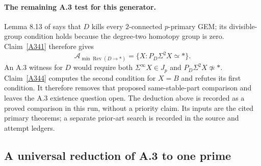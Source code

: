 \paragraph{The remaining A.3 test for this generator.}
Lemma 8.13 of \citet{ABousfield1997} says that $D$ kills every
$2$-connected $p$-primary GEM; its divisible-group condition
holds because the degree-two homotopy group is zero.
Claim~\ref{A341} therefore gives
\[
 \mathcal A_{\min\operatorname{Rev}(D\to*)}
   =\{X:P_D\Sigma^2X\simeq *\}.
 \tag{A34.4.6}
\]
An A.3 witness for $D$ would require both
$\Sigma^\infty X\in J_p$ and $P_D\Sigma^2X\not\simeq *$.
Claim~\ref{A344} computes the second condition for $X=B$ and
refutes its first condition.  It therefore removes that proposed
same-stable-part comparison and leaves the A.3 existence question open.
The deduction above is recorded as a proved comparison in this run,
without a priority claim.  Its inputs are the cited primary theorems;
a separate prior-art search is recorded in the source and attempt ledgers.

\subsection{A universal reduction of A.3 to one prime}
\label{sec:A34-prime-reduction}

